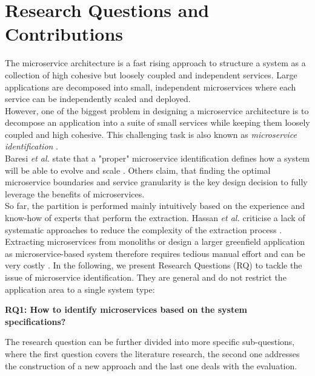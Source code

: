 \section{Research Questions and Contributions}
\label{sec:Introduction:ResearchQuestions}
The microservice architecture is a fast rising approach to structure a system as a collection of high cohesive but loosely coupled and independent services. Large applications are decomposed into small, independent microservices where each service can be independently scaled and deployed. 
\\
However, one of the biggest problem in designing a microservice architecture is to decompose an application into a suite of small services while keeping them loosely coupled and high cohesive. This challenging task is also known as \textit{microservice identification} \cite{ObjectAwareAmiri}. \\
Baresi \textit{et al.} state that a "proper" microservice identification defines how a system will be able to evolve and scale \cite{interfaceAnalysisBaresi}. Others claim, that finding the optimal microservice boundaries \cite{ClassificationOfRefactoring} and service granularity  \cite{ArchitecturalMetaModelling} is the key design decision to fully leverage the benefits of microservices. 
\\
So far, the partition is performed mainly intuitively based on the experience and know-how of experts that perform the extraction. Hassan \textit{et al.} criticise a lack of systematic approaches to reduce the complexity of the extraction process \cite{ArchitecturalMetaModelling}. Extracting microservices from monoliths or design a larger greenfield application as microservice-based system therefore requires tedious manual effort and can be very costly \cite{FunctionalDecompositionHeinrich} \cite{ExtractionMazlami}. In the following, we present Research Questions (RQ) to tackle the issue of microservice identification. They are general and do not restrict the application area to a single system type:


\vspace{1cm}
\par
\begingroup
\leftskip=1cm
\rightskip=1cm

\noindent
\textbf{RQ1: How to identify microservices based on the system specifications?}

\vspace{0.5cm}
\noindent
The research question can be further divided into more specific sub-questions, where the first question covers the literature research, the second one addresses the construction of a new approach and the last one deals with the evaluation.

